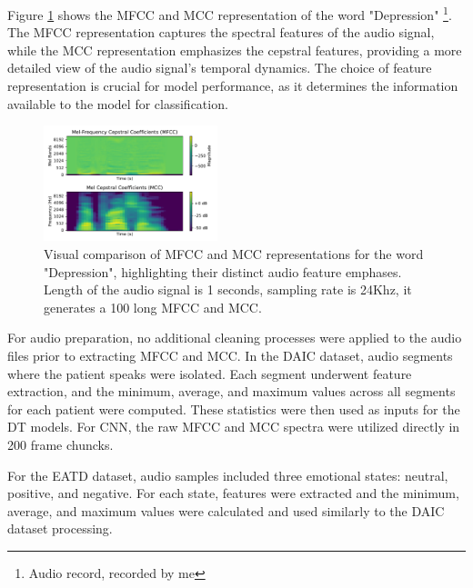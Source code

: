 Figure \ref{fig:mfcc_mcc} shows the MFCC and MCC representation of the word "Depression" \footnote{Audio record, recorded by me}. The MFCC representation captures the spectral features of the audio signal, while the MCC representation emphasizes the cepstral features, providing a more detailed view of the audio signal's temporal dynamics. The choice of feature representation is crucial for model performance, as it determines the information available to the model for classification.

\begin{figure}[H]
    \centering
    \includegraphics[width=0.45\textwidth]{vis_pdf/mfcc_mcc_comparison.pdf} %
    \caption{Visual comparison of MFCC and MCC representations for the word "Depression", highlighting their distinct audio feature emphases. Length of the audio signal is 1 seconds, sampling rate is 24Khz, it generates a 100 long MFCC and MCC.}
    \label{fig:mfcc_mcc}
\end{figure}

For audio preparation, no additional cleaning processes were applied to the audio files prior to extracting MFCC and MCC. In the DAIC dataset, audio segments where the patient speaks were isolated. Each segment underwent feature extraction, and the minimum, average, and maximum values across all segments for each patient were computed. These statistics were then used as inputs for the DT models. For CNN, the raw MFCC and MCC spectra were utilized directly in 200 frame chuncks.

For the EATD dataset, audio samples included three emotional states: neutral, positive, and negative. For each state, features were extracted and the minimum, average, and maximum values were calculated and used similarly to the DAIC dataset processing.




